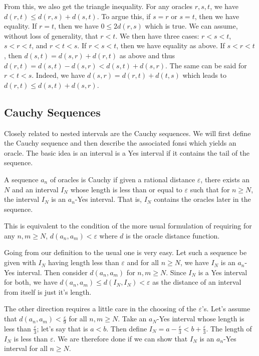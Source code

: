 \documentclass[12pt]{article}
\begin{document}
From this, we also get the triangle inequality. For any oracles $r, s, t$, we have $d(r,t) \leq d(r,s) + d(s,t)$.  To argue this, if $s = r$ or $s=t$, then we have equality. If $r=t$, then we have $0 \leq 2 d(r,s)$ which is true. We can assume, without loss of generality, that $r < t$. We then have three cases: $r< s< t$, $s < r < t$, and $r< t  < s$. If $r < s< t$, then we have equality as above. If $s < r < t$, then $d(s,t) = d(s,r) + d(r,t)$ as above and thus $d(r,t) = d(s,t) - d(s,r) < d(s,t) + d(s,r)$. The same can be said for $r < t < s$. Indeed,  we have $d(s,r) = d(r,t) + d(t,s)$ which leads to $d(r,t) \leq d(s,t) + d(s,r)$.

\subsection{Cauchy Sequences}\label{sec:cauchy}

Closely related to nested intervals are the Cauchy sequences. We will first define the Cauchy sequence and then describe the associated fonsi which yields an oracle. The basic idea is an interval is a Yes interval if it contains the tail of the sequence. 

A sequence $a_n$ of oracles is Cauchy if given a rational distance $\varepsilon$, there exists an $N$ and an interval $I_N$ whose length is less than or equal to $\varepsilon$ such that for $n \geq N$, the interval $I_N$ is an $a_n$-Yes interval. That is, $I_N$ contains the oracles later in the sequence. 

This is equivalent to the condition of the more usual formulation of requiring for any $n, m \geq N$, $d(a_n,  a_m) < \varepsilon$ where $d$ is the oracle distance function. 

Going from our definition to the usual one is very easy. Let such a sequence be given with $I_N$ having length less than $\varepsilon$ and for all $n \geq N$, we have $I_N$ is an $a_n$-Yes interval. Then consider $d(a_n, a_m)$ for $n, m \geq N$. Since $I_N$ is a Yes interval for both, we have $d(a_n, a_m) \leq d(I_N, I_N) < \varepsilon$ as the distance of an interval from itself is just it's length. 

The other direction requires a little care in the choosing of the $\varepsilon$'s. Let's assume that $d(a_n, a_m) < \frac{\varepsilon}{9}$ for all $n, m \geq N$. Take an $a_N$-Yes interval whose length is less than $\frac{\varepsilon}{3}$; let's say that is $a \lt b$. Then define $I_N = a-\frac{\varepsilon}{3} \lt b + \frac{\varepsilon}{3}$. The length of $I_N$ is less than $\varepsilon$. We are therefore done if we can show that $I_N$ is an $a_n$-Yes interval for all $n \geq N$.
\end{document}
